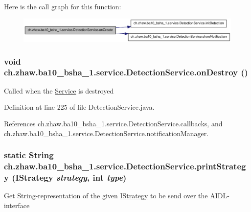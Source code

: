 Here is the call graph for this function:\nopagebreak
\begin{figure}[H]
\begin{center}
\leavevmode
\includegraphics[width=324pt]{classch_1_1zhaw_1_1ba10__bsha__1_1_1service_1_1DetectionService_a78b14ab8beb6bafa58ed1eb4c601d8a6_cgraph}
\end{center}
\end{figure}
\hypertarget{classch_1_1zhaw_1_1ba10__bsha__1_1_1service_1_1DetectionService_ad432cd1189d8ccb72ad4a32b4cd7fd0a}{
\subsubsection[{onDestroy}]{\setlength{\rightskip}{0pt plus 5cm}void ch.zhaw.ba10\_\-bsha\_\-1.service.DetectionService.onDestroy ()}}
\label{classch_1_1zhaw_1_1ba10__bsha__1_1_1service_1_1DetectionService_ad432cd1189d8ccb72ad4a32b4cd7fd0a}
Called when the \hyperlink{}{Service} is destroyed 

Definition at line 225 of file DetectionService.java.

References ch.zhaw.ba10\_\-bsha\_\-1.service.DetectionService.callbacks, and ch.zhaw.ba10\_\-bsha\_\-1.service.DetectionService.notificationManager.\hypertarget{classch_1_1zhaw_1_1ba10__bsha__1_1_1service_1_1DetectionService_a201836f7453d62a935b7eed1203b27f6}{
\subsubsection[{printStrategy}]{\setlength{\rightskip}{0pt plus 5cm}static String ch.zhaw.ba10\_\-bsha\_\-1.service.DetectionService.printStrategy ({\bf IStrategy} {\em strategy}, \/  int {\em type})}}
\label{classch_1_1zhaw_1_1ba10__bsha__1_1_1service_1_1DetectionService_a201836f7453d62a935b7eed1203b27f6}
Get String-\/representation of the given \hyperlink{}{IStrategy} to be send over the AIDL-\/interface


